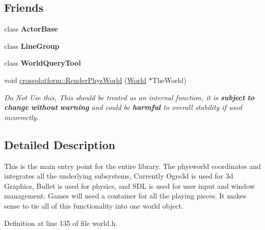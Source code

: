 \subsection*{Friends}
\begin{DoxyCompactItemize}
\item 
\hypertarget{classphys_1_1World_ac09063d4b0192680ba3aa0bd4003a274}{
class {\bfseries ActorBase}}
\label{da/ddf/classphys_1_1World_ac09063d4b0192680ba3aa0bd4003a274}

\item 
\hypertarget{classphys_1_1World_ac3f02140b13e7e7a2c6134b4e7f03d1f}{
class {\bfseries LineGroup}}
\label{da/ddf/classphys_1_1World_ac3f02140b13e7e7a2c6134b4e7f03d1f}

\item 
\hypertarget{classphys_1_1World_a280be5653a2a8825492b77a1e5739796}{
class {\bfseries WorldQueryTool}}
\label{da/ddf/classphys_1_1World_a280be5653a2a8825492b77a1e5739796}

\item 
void \hyperlink{classphys_1_1World_ac7946bdb41c7884bcd7cfdec2b5358f0}{crossplatform::RenderPhysWorld} (\hyperlink{classphys_1_1World}{World} $\ast$TheWorld)
\begin{DoxyCompactList}\small\item\em Do Not Use this, This should be treated as an internal function, it is {\bfseries subject} {\bfseries to} {\bfseries change} {\bfseries without} {\bfseries warning} and could be {\bfseries harmful} to overall stability if used incorrectly. \item\end{DoxyCompactList}\end{DoxyCompactItemize}


\subsection{Detailed Description}
This is the main entry point for the entire library. The physworld coordinates and integrates all the underlying subsystems, Currently Ogre3d is used for 3d Graphics, Bullet is used for physics, and SDL is used for user input and window management. Games will need a container for all the playing pieces. It makes sense to tie all of this functionality into one world object. 

Definition at line 135 of file world.h.



